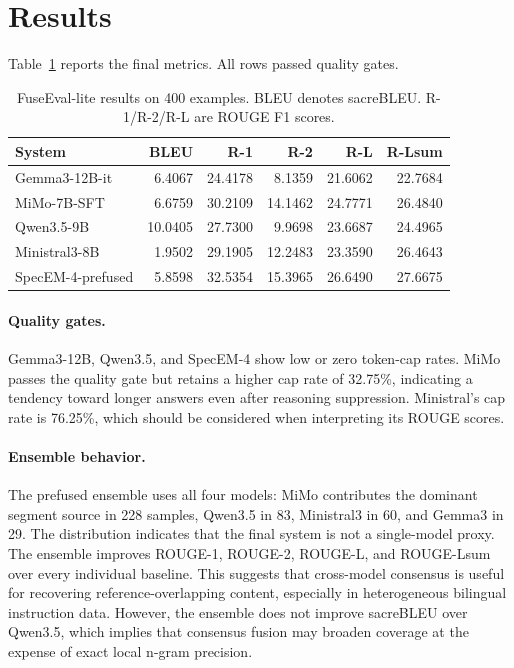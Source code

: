 \documentclass[11pt]{article}
\begin{document}
\section{Results}
Table~\ref{tab:results} reports the final metrics. All rows passed quality gates.

\begin{table}[h]
\centering
\begin{tabular}{lrrrrr}
\toprule
System & BLEU & R-1 & R-2 & R-L & R-Lsum \\
\midrule
Gemma3-12B-it & 6.4067 & 24.4178 & 8.1359 & 21.6062 & 22.7684 \\
MiMo-7B-SFT & 6.6759 & 30.2109 & 14.1462 & 24.7771 & 26.4840 \\
Qwen3.5-9B & 10.0405 & 27.7300 & 9.9698 & 23.6687 & 24.4965 \\
Ministral3-8B & 1.9502 & 29.1905 & 12.2483 & 23.3590 & 26.4643 \\
SpecEM-4-prefused & 5.8598 & 32.5354 & 15.3965 & 26.6490 & 27.6675 \\
\bottomrule
\end{tabular}
\caption{FuseEval-lite results on 400 examples. BLEU denotes sacreBLEU. R-1/R-2/R-L are ROUGE F1 scores.}
\label{tab:results}
\end{table}

\paragraph{Quality gates.} Gemma3-12B, Qwen3.5, and SpecEM-4 show low or zero token-cap rates. MiMo passes the quality gate but retains a higher cap rate of 32.75\%, indicating a tendency toward longer answers even after reasoning suppression. Ministral's cap rate is 76.25\%, which should be considered when interpreting its ROUGE scores.

\paragraph{Ensemble behavior.} The prefused ensemble uses all four models: MiMo contributes the dominant segment source in 228 samples, Qwen3.5 in 83, Ministral3 in 60, and Gemma3 in 29. The distribution indicates that the final system is not a single-model proxy. The ensemble improves ROUGE-1, ROUGE-2, ROUGE-L, and ROUGE-Lsum over every individual baseline. This suggests that cross-model consensus is useful for recovering reference-overlapping content, especially in heterogeneous bilingual instruction data. However, the ensemble does not improve sacreBLEU over Qwen3.5, which implies that consensus fusion may broaden coverage at the expense of exact local n-gram precision.
\end{document}
